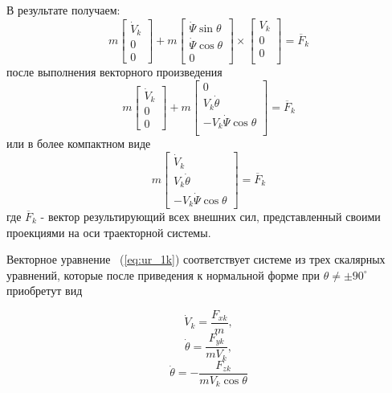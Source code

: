 В результате получаем:
\begin{equation}
m 
\begin{bmatrix}
\Dot{V}_k \\
0\\
0
\end{bmatrix} + m
\begin{bmatrix}
\Dot{\Psi} \sin{\theta} \\
\Dot{\Psi} \cos{\theta}\\
0
\end{bmatrix} \times 
\begin{bmatrix} V_k\\
0\\
0\\
\end{bmatrix} = \overline{F}_k
\end{equation}
после выполнения векторного произведения
\begin{equation}
m 
\begin{bmatrix}
\Dot{V}_k \\
0\\
0
\end{bmatrix} + m
\begin{bmatrix} 0\\
V_k \Dot{\theta}\\
- V_k \Dot{\Psi} \cos{\theta}\\
\end{bmatrix} = \overline{F}_k
\end{equation}
или в более компактном виде 
\begin{equation}
m 
\begin{bmatrix}
\Dot{V}_k \\
V_k \Dot{\theta}\\
- V_k \Dot{\Psi} \cos{\theta}
\end{bmatrix} = \overline{F}_k
\label{eq:ur_1k}
\end{equation}
где $\overline{F}_k$ - вектор результирующий всех внешних сил, представленный своими проекциями на оси траекторной системы.

Векторное уравнение ~(\ref{eq:ur_1k}) соответствует системе из трех скалярных уравнений, которые после приведения к нормальной форме при $\theta \neq \pm 90^{\circ}$ приобретут вид

\begin{equation}
\Dot{V}_k = \frac{F_{xk}}{m},
\end{equation}
\begin{equation}
\Dot{\theta} = \frac{F_{yk}}{mV_k},
\end{equation}
\begin{equation}
\Dot{\theta} =- \frac{F_{zk}}{mV_k\cos{\theta}}
\end{equation}
\clearpage

